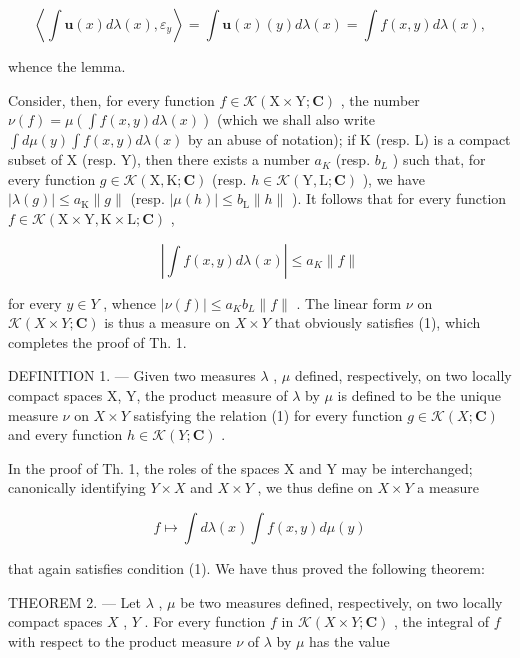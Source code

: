\[
\left\langle \int \mathbf {u} (x) d \lambda (x), \varepsilon_ {y} \right\rangle = \int \mathbf {u} (x) (y) d \lambda (x) = \int f (x, y) d \lambda (x),
\]

whence the lemma.

Consider, then, for every function \(f \in \mathcal{K}(\mathrm{X} \times \mathrm{Y}; \mathbf{C})\) , the number \(\nu(f) = \mu\left(\int f(x, y) d\lambda(x)\right)\) (which we shall also write \(\int d\mu(y) \int f(x, y) d\lambda(x)\) by an abuse of notation); if K (resp. L) is a compact subset of X (resp. Y), then there exists a number \(a_{K}\) (resp. \(b_{L}\) ) such that, for every function \(g \in \mathcal{K}(\mathrm{X}, \mathrm{K}; \mathbf{C})\) (resp. \(h \in \mathcal{K}(\mathrm{Y}, \mathrm{L}; \mathbf{C})\) ), we have \(|\lambda(g)| \leqslant a_{\mathrm{K}} \|g\|\) (resp. \(|\mu(h)| \leqslant b_{\mathrm{L}} \|h\|\) ). It follows that for every function \(f \in \mathcal{K}(\mathrm{X} \times \mathrm{Y}, \mathrm{K} \times \mathrm{L}; \mathbf{C})\) ,

\[
\left| \int f (x, y) d \lambda (x) \right| \leqslant a _ {K} \| f \|
\]

for every \(y \in Y\) , whence \(|\nu(f)| \leqslant a_{K}b_{L}\|f\|\) . The linear form \(\nu\) on \(\mathcal{K}(X \times Y; \mathbf{C})\) is thus a measure on \(X \times Y\) that obviously satisfies (1), which completes the proof of Th. 1.

DEFINITION 1. --- Given two measures \(\lambda\) , \(\mu\) defined, respectively, on two locally compact spaces X, Y, the product measure of \(\lambda\) by \(\mu\) is defined to be the unique measure \(\nu\) on \(X \times Y\) satisfying the relation (1) for every function \(g \in \mathcal{K}(X; \mathbf{C})\) and every function \(h \in \mathcal{K}(Y; \mathbf{C})\) .

In the proof of Th. 1, the roles of the spaces X and Y may be interchanged; canonically identifying \(Y \times X\) and \(X \times Y\) , we thus define on \(X \times Y\) a measure

\[
f \mapsto \int d \lambda (x) \int f (x, y) d \mu (y)
\]

that again satisfies condition (1). We have thus proved the following theorem:

THEOREM 2. --- Let \(\lambda\) , \(\mu\) be two measures defined, respectively, on two locally compact spaces \(X\) , \(Y\) . For every function \(f\) in \(\mathcal{K}(X \times Y; \mathbf{C})\) , the integral of \(f\) with respect to the product measure \(\nu\) of \(\lambda\) by \(\mu\) has the value

